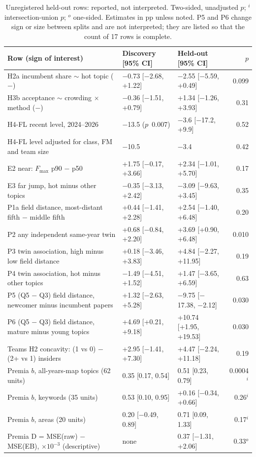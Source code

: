 \begin{table}[t]
\centering\footnotesize
\begin{tabularx}{\textwidth}{@{}>{\raggedright\arraybackslash}X l l r@{}}
\toprule
Row (sign of interest) & Discovery [95\% CI] & Held-out [95\% CI] & $p$ \\
\midrule
H2a incumbent share $\sim$ hot topic ($-$) & $-$0.73 [$-$2.68, +1.22] & $-$2.55 [$-$5.59, +0.49] & 0.099 \\
H3b acceptance $\sim$ crowding $\times$ method ($-$) & $-$0.36 [$-$1.51, +0.79] & +1.34 [$-$1.26, +3.93] & 0.31 \\
H4-FL recent level, 2024--2026 & $-$13.5 ($p$~0.007) & $-$3.6 [$-$17.2, +9.9] & 0.52 \\
H4-FL level adjusted for class, FM and team size & $-$10.5 & $-$3.4 & 0.42 \\
E2 near: $F_{\max}$ p90 $-$ p50 & +1.75 [$-$0.17, +3.66] & +2.34 [$-$1.01, +5.70] & 0.17 \\
E3 far jump, hot minus other topics & $-$0.35 [$-$3.13, +2.42] & $-$3.09 [$-$9.63, +3.45] & 0.35 \\
P1a field distance, most-distant fifth $-$ middle fifth & +0.44 [$-$1.41, +2.28] & +2.54 [$-$1.40, +6.48] & 0.20 \\
P2 any independent same-year twin & +0.68 [$-$0.84, +2.20] & +3.69 [+0.90, +6.48] & 0.010 \\
P3 twin association, high minus low field distance & +0.18 [$-$3.46, +3.83] & +4.84 [$-$2.27, +11.95] & 0.19 \\
P4 twin association, hot minus other topics & $-$1.49 [$-$4.51, +1.52] & +1.47 [$-$3.65, +6.59] & 0.63 \\
P5 (Q5 $-$ Q3) field distance, newcomer minus incumbent papers & +1.32 [$-$2.63, +5.28] & $-$9.75 [$-$17.38, $-$2.12] & 0.030 \\
P6 (Q5 $-$ Q3) field distance, mature minus young topics & +4.69 [+0.21, +9.18] & +10.74 [+1.95, +19.53] & 0.030 \\
Teams H2 concavity: (1 vs 0) $-$ (2+ vs 1) insiders & +2.95 [$-$1.41, +7.30] & +4.47 [$-$2.24, +11.18] & 0.19 \\
Premia $b$, all-years-map topics (62 units) & 0.35 [0.17, 0.54] & 0.51 [0.23, 0.79] & 0.0004$^i$ \\
Premia $b$, keywords (35 units) & 0.53 [0.10, 0.95] & +0.16 [$-$0.34, +0.66] & 0.26$^i$ \\
Premia $b$, areas (20 units) & 0.20 [$-$0.49, 0.89] & 0.71 [0.09, 1.33] & 0.17$^i$ \\
Premia D = MSE(raw) $-$ MSE(EB), $\times10^{-3}$ (descriptive) & none & 0.37 [$-$1.31, +2.06] & 0.33$^o$ \\
\bottomrule
\end{tabularx}
\caption{Unregistered held-out rows: reported, not interpreted. Two-sided, unadjusted $p$; $^i$ intersection-union
$p$; $^o$ one-sided. Estimates in pp unless noted. P5 and P6 change sign or size between splits and are not
interpreted; they are listed so that the count of 17 rows is complete.}
\label{tab:app-unreg}
\end{table}

